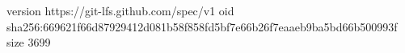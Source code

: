 version https://git-lfs.github.com/spec/v1
oid sha256:669621f66d87929412d081b58f858fd5bf7e66b26f7eaaeb9ba5bd66b500993f
size 3699
